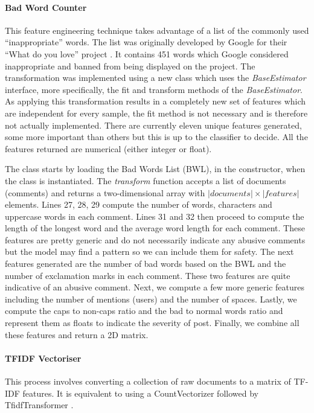 \paragraph{Bad Word Counter} This feature engineering technique takes advantage of a list of the commonly used ``inappropriate'' words. The list was originally developed by Google for their ``What do you love'' project \cite{GitHub:GoogleBadWordList}. It contains 451 words which Google considered inappropriate and banned from being displayed on the project. The transformation was implemented using a new class which uses the \emph{BaseEstimator} interface, more specifically, the fit and transform methods of the \emph{BaseEstimator}. As applying this transformation results in a completely new set of features which are independent for every sample, the fit method is not necessary and is therefore not actually implemented. There are currently eleven unique features generated, some more important than others but this is up to the classifier to decide. All the features returned are numerical (either integer or float).

The class starts by loading the Bad Words List (BWL), in the constructor, when the class is instantiated. The \emph{transform} function accepts a list of documents (comments) and returns a two-dimensional array with $|documents| \times |features|$ elements. Lines 27, 28, 29 compute the number of words, characters and uppercase words in each comment. Lines 31 and 32 then proceed to compute the length of the longest word and the average word length for each comment. These features are pretty generic and do not necessarily indicate any abusive comments but the model may find a pattern so we can include them for safety. The next features generated are the number of bad words based on the BWL and the number of exclamation marks in each comment. These two features are quite indicative of an abusive comment. Next, we compute a few more generic features including the number of mentions (users) and the number of spaces. Lastly, we compute the caps to non-caps ratio and the bad to normal words ratio and represent them as floats to indicate the severity of post. Finally, we combine all these features and return a 2D matrix.

\paragraph{TFIDF Vectoriser} This process involves converting a collection of raw documents to a matrix of TF-IDF features. It is equivalent to using a CountVectorizer followed by TfidfTransformer \cite{Scikit:TFIDFVectorizer}. 


